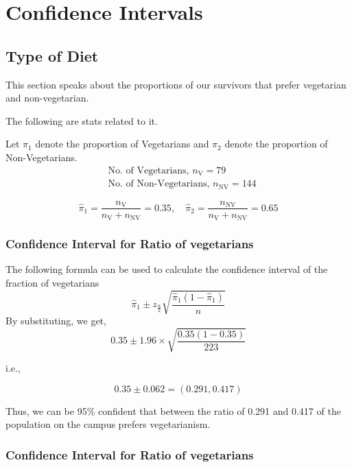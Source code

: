 \documentclass[12pt]{article}
\begin{document}
\section{Confidence Intervals} 
\subsection{Type of Diet}


 This section speaks about the proportions of our survivors that prefer vegetarian and non-vegetarian.
    
    The following are stats related to it.
    
    Let $\pi_1$ denote the proportion of Vegetarians and $\pi_2$ denote the proportion of Non-Vegetarians.
    \begin{align}
        &\text{No. of Vegetarians, } n_{\text{V}} = 79 \\
        &\text{No. of Non-Vegetarians, } n_{\text{NV}} = 144 
    \end{align}

    \begin{equation}
        \hat{\pi}_1 = \frac{n_{\text{V}}}{n_{\text{V}} + n_{\text{NV}}} = 0.35, \quad \hat{\pi}_2 = \frac{n_{\text{NV}}}{n_{\text{V}} + n_{\text{NV}} } = 0.65
    \end{equation}


\subsubsection{Confidence Interval for Ratio of vegetarians}

    The following formula can be used to calculate the confidence interval of the fraction  of vegetarians 
    \begin{equation}
    \hat{\pi}_1 \pm z_{\frac{\alpha}{2}} \sqrt{\frac{\hat{\pi}_1(1 - \hat{\pi}_1)}{n}}
    \end{equation}
    By substituting, we get,
    \begin{equation}
    0.35 \pm 1.96 \times \sqrt{\frac{0.35(1 - 0.35)}{223}}
    \end{equation}
    
    i.e.,

    \[
    0.35 \pm 0.062 = (0.291, 0.417)
    \]

    
    Thus, we can be 95\% confident that between the ratio of 0.291 and 0.417 of the population on the campus prefers vegetarianism.

\subsubsection{Confidence Interval for Ratio of vegetarians}
\end{document}
